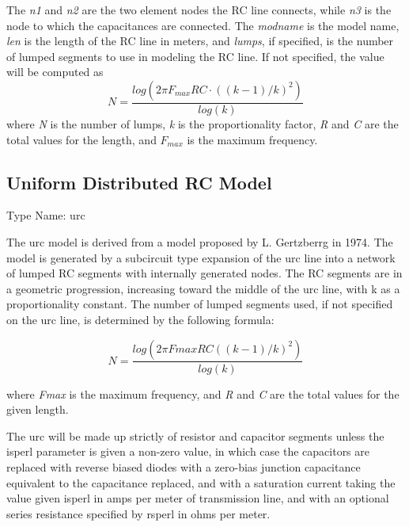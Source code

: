 The {\it n1} and {\it n2} are the two element nodes the RC line
connects, while {\it n3} is the node to which the capacitances are
connected.  The {\it modname} is the model name, {\it len} is the
length of the RC line in meters, and {\it lumps}, if specified, is
the number of lumped segments to use in modeling the RC line.  If
not specified, the value will be computed as
\begin{displaymath}
N = \frac{log\left(2{\pi}{F_{max}}RC\cdot\left((k-1)/k\right)^2\right)}{log(k)}
\end{displaymath}
where {\it N} is the number of lumps, {\it k} is the proportionality
factor, {\it R} and {\it C} are the total values for the length, and
$F_{max}$ is the maximum frequency.

\subsection{Uniform Distributed RC Model}
\label{urcmodel}


{\cb Type Name:} {\vt urc}

The urc model is derived from a model proposed by L.  Gertzberrg in
1974.  The model is generated by a subcircuit type expansion of the
urc line into a network of lumped RC segments with internally
generated nodes.  The RC segments are in a geometric progression,
increasing toward the middle of the urc line, with {\vt k} as a
proportionality constant.  The number of lumped segments used, if not
specified on the urc line, is determined by the following formula:

\begin{displaymath}
N = \frac{log\left(2{\pi}Fmax RC \left((k-1)/k\right)^2\right)}{log(k)}
\end{displaymath}

where {\it Fmax} is the maximum frequency, and {\it R} and {\it C} are
the total values for the given length.

The urc will be made up strictly of resistor and capacitor segments
unless the {\vt isperl} parameter is given a non-zero value, in which
case the capacitors are replaced with reverse biased diodes with a
zero-bias junction capacitance equivalent to the capacitance replaced,
and with a saturation current taking the value given {\vt isperl\/} in
amps per meter of transmission line, and with an optional series
resistance specified by {\vt rsperl} in ohms per meter.

